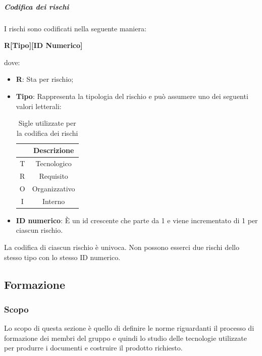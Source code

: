       \subparagraph {Codifica dei rischi}
      I rischi sono codificati nella seguente maniera: \\
      \begin{center}
        \textbf{\Large{R[Tipo][ID Numerico]}}
      \end{center}
    dove:
    \begin{itemize}[label={}]
      \item \textbf{R}: Sta per rischio;
      \item \textbf{Tipo}: Rappresenta la tipologia del rischio e può assumere uno dei seguenti valori letterali:
      \begin{table}[H]
        \centering
        \renewcommand{\arraystretch}{1.8}
        \begin{tabular}{c|c}
          \rowcolor[HTML]{125E28} 
          \multicolumn{1}{c}{\color[HTML]{FFFFFF}\textbf{Sigla}}
          & \multicolumn{1}{c}{\color[HTML]{FFFFFF}\textbf{Descrizione}}\\
          \hline
          T & Tecnologico\\
          R & Requisito\\
          O & Organizzativo\\
          I & Interno\\
        \end{tabular}
        \caption{Sigle utilizzate per la codifica dei rischi}
      \end{table} 
      \item \textbf{ID numerico}: È un id crescente che parte da 1 e viene incrementato di 1 per ciascun rischio.\\
    \end{itemize}
    La codifica di ciascun rischio è univoca. Non possono esserci due rischi dello stesso tipo con lo stesso ID numerico.

    \vspace{2cm}

        \subsection{Formazione} \label{subsection: formazione}
        \subsubsection {Scopo}
        Lo scopo di questa sezione è quello di definire le norme riguardanti il processo di formazione dei membri del gruppo \groupName{} e quindi lo studio delle tecnologie utilizzate per produrre i documenti e costruire il prodotto richiesto.
